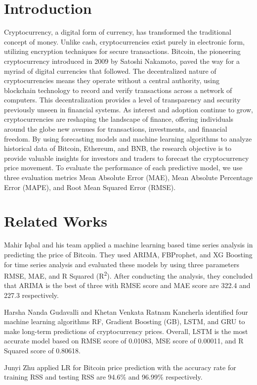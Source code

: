 \documentclass{ieeeojies}
\begin{document}
\section{Introduction}
\label{sec:introduction}
Cryptocurrency, a digital form of currency, has transformed the traditional concept of money. Unlike cash, cryptocurrencies exist purely in electronic form, utilizing encryption techniques for secure transactions. Bitcoin, the pioneering cryptocurrency introduced in 2009 by Satoshi Nakamoto, paved the way for a myriad of digital currencies that followed. The decentralized nature of cryptocurrencies means they operate without a central authority, using blockchain technology to record and verify transactions across a network of computers. This decentralization provides a level of transparency and security previously unseen in financial systems. As interest and adoption continue to grow, cryptocurrencies are reshaping the landscape of finance, offering individuals around the globe new avenues for transactions, investments, and financial freedom. \newline
By using forecasting models and machine learning algorithms to analyze historical data of Bitcoin, Ethereum, and BNB, the research objective is to provide valuable insights for investors and traders to forecast the cryptocurrency price movement. To evaluate the performance of each predictive model, we use three evaluation metrics Mean Absolute Error (MAE), Mean Absolute Percentage Error (MAPE), and Root Mean Squared Error (RMSE).
\section{Related Works}
Mahir Iqbal and his team \cite{b1} applied a machine learning based time series analysis in predicting the price of Bitcoin. They used ARIMA, FBProphet, and XG Boosting for time series analysis and evaluated these models by using three parameters RMSE, MAE, and R Squared (R\textsuperscript{2}). After conducting the analysis, they concluded that ARIMA is the best of three with RMSE score and MAE score are 322.4 and 227.3 respectively.

Harsha Nanda Gudavalli and Khetan Venkata Ratnam Kancherla \cite{b2} identified four machine learning algorithms RF, Gradient Boosting (GB), LSTM, and GRU to make long-term predictions of cryptocurrency prices. Overall, LSTM is the most accurate model based on RMSE score of 0.01083, MSE score of 0.00011, and R Squared score of 0.80618.

Junyi Zhu \cite{b3} applied LR for Bitcoin price prediction with the accuracy rate for training RSS and testing RSS are 94.6\% and 96.99\% respectively.
\end{document}
